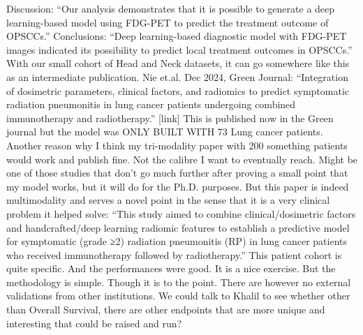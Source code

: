 \documentclass{article}%
\begin{document}
%
Discussion: “Our analysis demonstrates that it is possible to generate a deep learning{-}based model using FDG{-}PET to predict the treatment outcome of OPSCCs.” %
\newline%
\newline%
%
Conclusions: “Deep learning{-}based diagnostic model with FDG{-}PET images indicated its possibility to predict local treatment outcomes in OPSCCs.” %
\newline%
\newline%
%
With our small cohort of Head and Neck datasets, it can go somewhere like this as an intermediate publication. %
\newline%
\newline%
%
Nie et.al. Dec 2024, Green Journal: “Integration of dosimetric parameters, clinical factors, and radiomics to predict symptomatic radiation pneumonitis in lung cancer patients undergoing combined immunotherapy and radiotherapy.” {[}link{]}%
\newline%
\newline%
%
This is published now in the Green journal but the model was ONLY BUILT WITH 73 Lung cancer patients. %
\newline%
\newline%
%
Another reason why I think my tri{-}modality paper with 200 something patients would work and publish fine. Not the calibre I want to eventually reach. Might be one of those studies that don’t go much further after proving a small point that my model works, but it will do for the Ph.D. purposes. %
\newline%
\newline%
%
But this paper is indeed multimodality and serves a novel point in the sense that it is a very clinical problem it helped solve: “This study aimed to combine clinical/dosimetric factors and handcrafted/deep learning radiomic features to establish a predictive model for symptomatic (grade ≥2) radiation pneumonitis (RP) in lung cancer patients who received immunotherapy followed by radiotherapy.” This patient cohort is quite specific. And the performances were good. It is a nice exercise.  %
\newline%
\newline%
%
But the methodology is simple. Though it is to the point. There are however no external validations from other institutions. %
\newline%
\newline%
%
We could talk to Khalil to see whether other than Overall Survival, there are other endpoints that are more unique and interesting that could be raised and run? %
\end{document}
